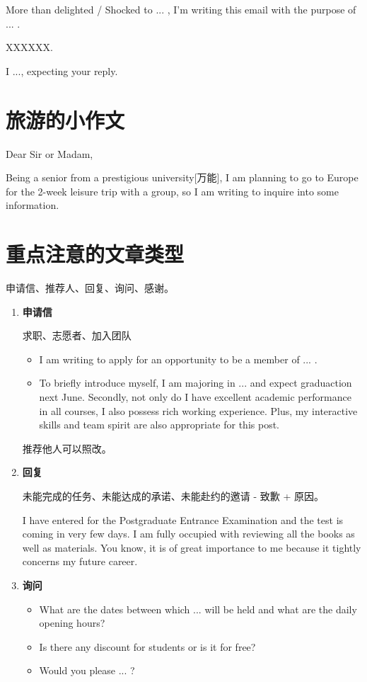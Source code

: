 More than delighted / Shocked to ... , I'm writing this email with 
the purpose of ... .

XXXXXX.

I ..., expecting your reply.

\YTLM

\section{旅游的小作文}

\noindent Dear Sir or Madam, 

Being a senior from a prestigious university[万能], I am planning to go to Europe for 
the 2-week leisure trip with a group, so I am writing to inquire into some information.

\section{重点注意的文章类型}

申请信、推荐人、回复、询问、感谢。

\begin{enumerate}
    \item \textbf{申请信} 
    
    求职、志愿者、加入团队

    \begin{itemize}
        \item I am writing to apply for an opportunity to be a member of ... .
        \item To briefly introduce myself, I am majoring in ... and 
        expect graduaction next June. Secondly, not only do I have excellent 
        academic performance in all courses, I also possess rich working 
        experience. Plus, my interactive skills and team spirit are also 
        appropriate for this post.
    \end{itemize}

    推荐他人可以照改。
    \item \textbf{回复}
    
    未能完成的任务、未能达成的承诺、未能赴约的邀请 - 致歉 + 原因。

    I have entered for the Postgraduate Entrance Examination and the test is coming in very few days. 
    I am fully occupied with reviewing all the books as well as materials. You know, it is of great 
    importance to me because it tightly concerns my future career.
    \item \textbf{询问}
    
    \begin{itemize}
        \item What are the dates between which ... will be held and what are the daily opening hours?
        \item Is there any discount for students or is it for free?
        \item Would you please ... ?
    \end{itemize} 
\end{enumerate}

